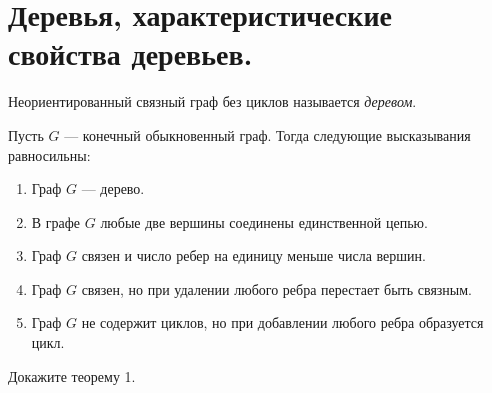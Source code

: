 \section{Деревья, характеристические свойства деревьев.}

\begin{definition}
    Неориентированный связный граф без циклов называется \textit{деревом}.
\end{definition}

\begin{theorem}
    Пусть $G$ --- конечный обыкновенный граф. Тогда следующие высказывания равносильны:
    \begin{enumerate}
        \item Граф $G$ --- дерево.
        \item В графе $G$ любые две вершины соединены единственной цепью.
        \item Граф $G$ связен и число ребер на единицу меньше числа вершин.
        \item Граф $G$ связен, но при удалении любого ребра перестает быть связным.
        \item Граф $G$ не содержит циклов, но при добавлении любого ребра образуется цикл.
    \end{enumerate}
\end{theorem}

\begin{exercise}
    Докажите теорему 1.
\end{exercise}